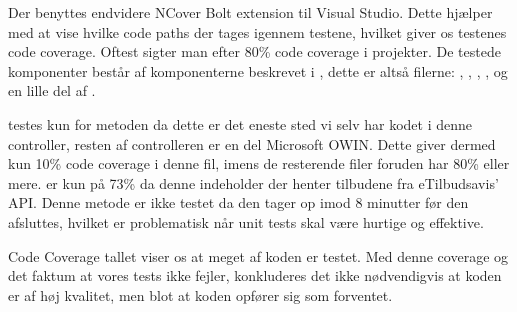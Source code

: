 Der benyttes endvidere NCover Bolt extension til Visual Studio. 
Dette hjælper med at vise hvilke code paths der tages igennem testene, hvilket giver os testenes code coverage.
Oftest sigter man efter 80\% code coverage i projekter. \citep{Code_Coverage}
De testede komponenter består af komponenterne beskrevet i , dette er altså filerne: , , , ,  og en lille del af .

 testes kun for metoden  da dette er det eneste sted vi selv har kodet i denne controller, resten af controlleren er en del Microsoft OWIN.
Dette giver dermed kun 10\% code coverage i denne fil, imens de resterende filer foruden   har 80\% eller mere.
 er kun på 73\% da denne indeholder  der henter tilbudene fra eTilbudsavis' API. 
Denne metode er ikke testet da den tager op imod 8 minutter før den afsluttes, hvilket er problematisk når unit tests skal være hurtige og effektive.

Code Coverage tallet viser os at meget af koden er testet.
Med denne coverage og det faktum at vores tests ikke fejler, konkluderes det ikke nødvendigvis at koden er af høj kvalitet, men blot at koden opfører sig som forventet.
